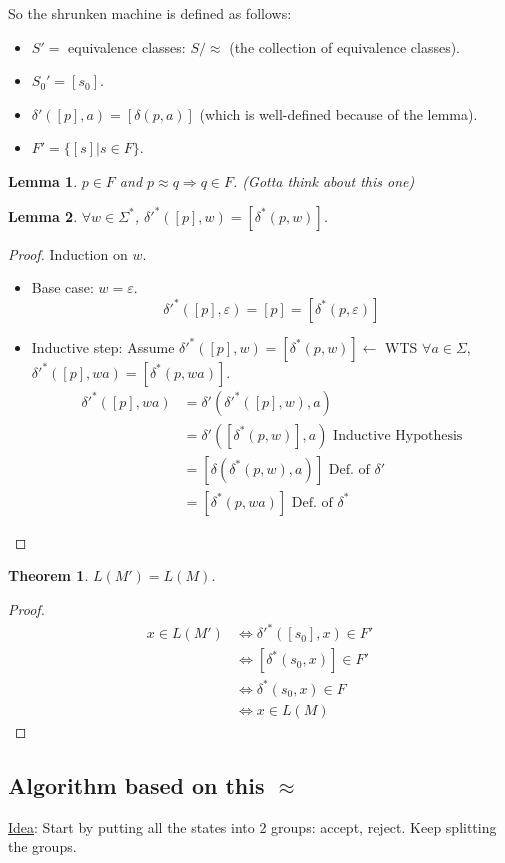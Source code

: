 \documentclass{article}
\newtheorem{theorem}{Theorem}
\newtheorem{lemma}{Lemma}
\begin{document}
\noindent So the shrunken machine is defined as follows:
\begin{itemize}
    \item $S' =$ equivalence classes: $S/\approx$ (the collection of equivalence classes).
    \item $S_0' = [s_0]$.
    \item $\delta'([p],a) = [\delta(p,a)]$ (which is well-defined because of the lemma).
    \item $F' = \{[s] | s\in F\}$.
\end{itemize}
\begin{lemma}
$p \in F$ and $p \approx q \Rightarrow q \in F$. (Gotta think about this one)
\end{lemma}
\begin{lemma}
$\forall w \in \Sigma^*$, $\delta'^*([p],w) = [\delta^*(p,w)]$.
\end{lemma}
\begin{proof}
Induction on $w$.
\begin{itemize}
    \item Base case: $w = \varepsilon$.
    \[\delta'^*([p],\varepsilon) = [p] = [\delta^*(p,\varepsilon)]\]
    \item Inductive step: Assume $\delta'^*([p],w) = [\delta^*(p,w)] \leftarrow$ WTS $\forall a \in \Sigma$, $\delta'^*([p],wa) = [\delta^*(p,wa)]$.
    \begin{align*}
        \delta'^*([p],wa) &= \delta'(\delta'^*([p],w),a)\\
        &= \delta'([\delta^*(p,w)],a) \text{ Inductive Hypothesis}\\
        &= [\delta(\delta^*(p,w),a)] \text{ Def. of } \delta'\\
        &= [\delta^*(p,wa)] \text{ Def. of } \delta^*
    \end{align*}
\end{itemize}
\end{proof}
\begin{theorem}
$L(M') = L(M)$.
\end{theorem}
\begin{proof}
\begin{align*}
    x \in L(M') &\iff \delta'^*([s_0],x) \in F'\\
    &\iff [\delta^*(s_0,x)] \in F'\\
    &\iff \delta^*(s_0,x) \in F\\
    &\iff x \in L(M)
\end{align*}
\end{proof}
\subsection{Algorithm based on this $\approx$}
\underline{Idea}: Start by putting all the states into 2 groups: accept, reject. Keep splitting the groups.
\end{document}
